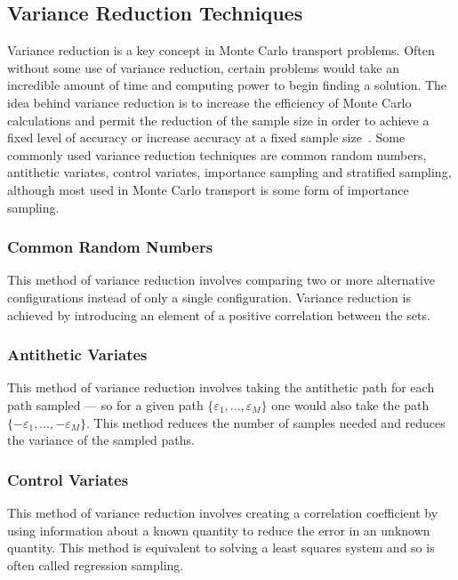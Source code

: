 \subsection{ \textbf{Variance Reduction Techniques} }

Variance reduction is a key concept in Monte Carlo transport problems.
%
Often without some use of variance reduction, certain problems would take an incredible amount of time and computing power to begin finding a solution.
%
The idea behind variance reduction is to increase the efficiency of Monte Carlo calculations and permit the reduction of the sample size in order to achieve a fixed level of accuracy or increase accuracy at a fixed sample size~\cite{kahn1953methods}.
%
Some commonly used variance reduction techniques are common random numbers, antithetic variates, control variates, importance sampling and stratified sampling, although most used in Monte Carlo transport is some form of importance sampling.
%

\subsubsection*{\textbf{Common Random Numbers}} This method of variance reduction involves comparing two or more alternative configurations instead of only a single configuration. Variance reduction is achieved by introducing an element of a positive correlation between the sets.~\cite{wikipediaVarReduction}

\subsubsection*{\textbf{Antithetic Variates}} This method of variance reduction involves taking the antithetic path for each path sampled --- so for a given path $ \{ \varepsilon_1, ..., \varepsilon_M \}$ one would also take the path $ \{ -\varepsilon_1, ... , -\varepsilon_M  \} $. This method reduces the number of samples needed and reduces the variance of the sampled paths. ~\cite{wikipediaAntitheticVaraites}

\subsubsection*{\textbf{Control Variates}} This method of variance reduction involves creating a correlation coefficient by using information about a known quantity to reduce the error in an unknown quantity. This method is equivalent to solving a least squares system and so is often called regression sampling. ~\cite{wikipediaControlVaraites}

